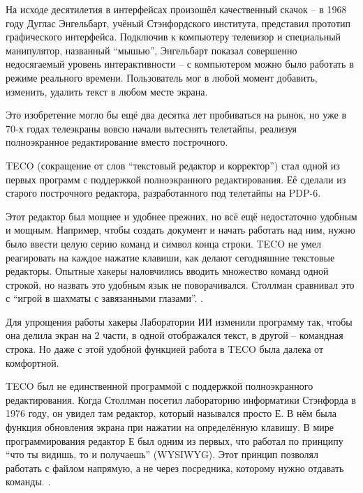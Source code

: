 На исходе десятилетия в интерфейсах произошёл качественный скачок -- в 1968 году Дуглас Энгельбарт, учёный Стэнфордского института, представил прототип графического интерфейса. Подключив к компьютеру телевизор и специальный манипулятор, названный \enquote{мышью}, Энгельбарт показал совершенно недосягаемый уровень интерактивности -- с компьютером можно было работать в режиме реального времени. Пользователь мог в любой момент добавить, изменить, удалить текст в любом месте экрана.

Это изобретение могло бы ещё два десятка лет пробиваться на рынок, но уже в 70-х годах телеэкраны вовсю начали вытеснять телетайпы, реализуя полноэкранное редактирование вместо построчного.

TECO (сокращение от слов \enquote{текстовый редактор и корректор}) стал одной из первых программ с поддержкой полноэкранного редактирования. Её сделали из старого построчного редактора, разработанного под телетайпы на PDP-6. 

Этот редактор был мощнее и удобнее прежних, но всё ещё недостаточно удобным и мощным. Например, чтобы создать документ и начать работать над ним, нужно было ввести целую серию команд и символ конца строки. TECO не умел реагировать на каждое нажатие клавиши, как делают сегодняшние текстовые редакторы. Опытные хакеры наловчились вводить множество команд одной строкой, но назвать это удобным язык не поворачивался. Столлман сравнивал это с \enquote{игрой в шахматы с завязанными глазами}. .

Для упрощения работы хакеры Лаборатории ИИ изменили программу так, чтобы она делила экран на 2 части, в одной отображался текст, в другой -- командная строка. Но даже с этой удобной функцией работа в TECO была далека от комфортной.

TECO был не единственной программой с поддержкой полноэкранного редактирования. Когда Столлман посетил лабораторию информатики Стэнфорда в 1976 году, он увидел там редактор, который назывался просто Е. В нём была функция обновления экрана при нажатии на определённую клавишу. В мире программирования редактор Е был одним из первых, что работал по принципу \enquote{что ты видишь, то и получаешь} (WYSIWYG). Этот принцип позволял работать с файлом напрямую, а не через посредника, которому нужно отдавать команды. .

